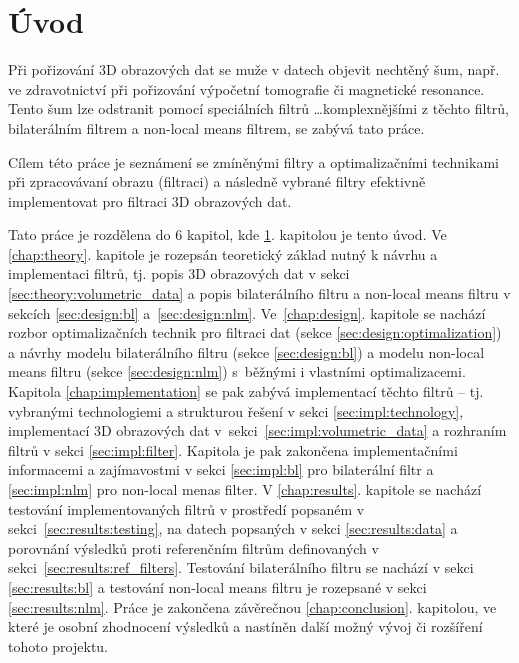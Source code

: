 
\chapter{Úvod}
\label{chap:introduction}

Při pořizování 3D obrazových dat se muže v datech objevit nechtěný šum, např.  ve zdravotnictví při pořizování výpočetní tomografie či magnetické resonance. Tento šum lze odstranit pomocí speciálních filtrů \dots komplexnějšími z těchto filtrů, bilaterálním filtrem a non-local means filtrem, se zabývá tato práce. 

Cílem této práce je seznámení se zmíněnými filtry a optimalizačními technikami při zpracovávaní obrazu (filtraci) a následně vybrané filtry efektivně implementovat pro filtraci 3D obrazových dat.

Tato práce je rozdělena do 6 kapitol, kde \ref{chap:introduction}. kapitolou je tento úvod. Ve \ref{chap:theory}. kapitole je rozepsán teoretický základ nutný k návrhu a implementaci filtrů, tj. popis 3D obrazových dat v sekci \ref{sec:theory:volumetric_data} a popis bilaterálního filtru a non-local means filtru v sekcích \ref{sec:design:bl} a~\ref{sec:design:nlm}. Ve~\ref{chap:design}. kapitole se nachází rozbor optimalizačních technik pro filtraci dat (sekce \ref{sec:design:optimalization}) a návrhy modelu bilaterálního filtru (sekce \ref{sec:design:bl}) a modelu non-local means filtru (sekce \ref{sec:design:nlm}) s~běžnými i vlastními optimalizacemi. 
Kapitola \ref{chap:implementation} se pak zabývá implementací těchto filtrů -- tj. vybranými technologiemi a strukturou řešení v sekci \ref{sec:impl:technology}, implementací 3D obrazových dat v~sekci~\ref{sec:impl:volumetric_data} a rozhraním filtrů v sekci \ref{sec:impl:filter}. Kapitola je pak zakončena implementačními informacemi a zajímavostmi v sekci \ref{sec:impl:bl} pro bilaterální filtr a \ref{sec:impl:nlm} pro non-local menas filter. V \ref{chap:results}. kapitole se nachází testování implementovaných filtrů v prostředí popsaném v sekci~\ref{sec:results:testing}, na datech popsaných v sekci \ref{sec:results:data} a porovnání výsledků proti referenčním filtrům definovaných v sekci~\ref{sec:results:ref_filters}. Testování bilaterálního filtru se nachází v  sekci \ref{sec:results:bl} a testování non-local means filtru je rozepsané v sekci \ref{sec:results:nlm}. Práce je zakončena závěrečnou \ref{chap:conclusion}. kapitolou, ve které je osobní zhodnocení výsledků a nastíněn další možný vývoj či rozšíření tohoto projektu.

